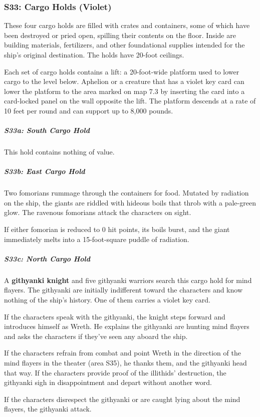 \documentclass[10pt,a4paper,twoside,bg=print,twocolumn,openany,nodeprecatedcode]{dndbook}
\begin{document}
\subsubsection{S33: Cargo Holds (Violet)}
These four cargo holds are filled with crates and containers, some of which have been destroyed or pried open, spilling their contents on the floor. Inside are building materials, fertilizers, and other foundational supplies intended for the ship's original destination. The holds have 20-foot ceilings.

Each set of cargo holds contains a lift: a 20-foot-wide platform used to lower cargo to the level below. Aphelion or a creature that has a violet key card can lower the platform to the area marked on map 7.3 by inserting the card into a card-locked panel on the wall opposite the lift. The platform descends at a rate of 10 feet per round and can support up to 8,000 pounds.

\subparagraph{S33a: South Cargo Hold}
This hold contains nothing of value.

\subparagraph{S33b: East Cargo Hold}
Two fomorians rummage through the containers for food. Mutated by radiation on the ship, the giants are riddled with hideous boils that throb with a pale-green glow. The ravenous fomorians attack the characters on sight.

If either fomorian is reduced to 0 hit points, its boils burst, and the giant immediately melts into a 15-foot-square puddle of radiation.

\subparagraph{S33c: North Cargo Hold}
A \textbf{githyanki knight} and five githyanki warriors search this cargo hold for mind flayers. The githyanki are initially indifferent toward the characters and know nothing of the ship's history. One of them carries a violet key card.

If the characters speak with the githyanki, the knight steps forward and introduces himself as Wreth. He explains the githyanki are hunting mind flayers and asks the characters if they've seen any aboard the ship.

If the characters refrain from combat and point Wreth in the direction of the mind flayers in the theater (area S35), he thanks them, and the githyanki head that way. If the characters provide proof of the illithids' destruction, the githyanki sigh in disappointment and depart without another word.

If the characters disrespect the githyanki or are caught lying about the mind flayers, the githyanki attack.
\end{document}
